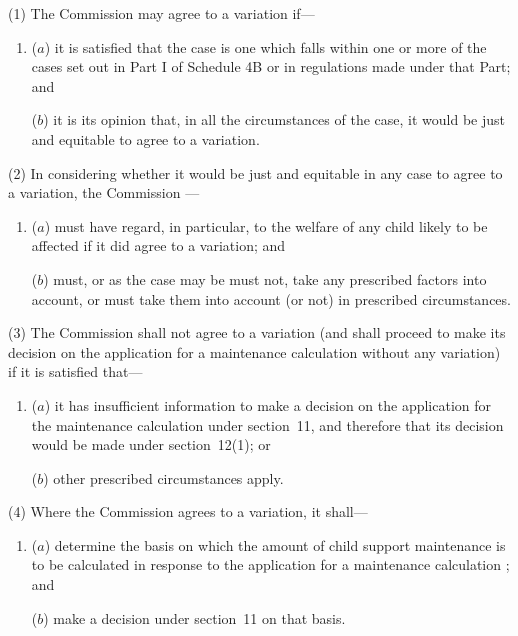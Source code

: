 \documentclass[12pt,a4paper]{article}
\begin{document}
(1) The 
Commission  %
may agree to a variation if—
\begin{enumerate}\item[]
($a$) 
it  %
is satisfied that the case is one which falls within one or more of the cases set out in Part I of Schedule 4B or in regulations made under that Part; and

($b$) it is 
its  %
opinion that, in all the circumstances of the case, it would be just and equitable to agree to a variation.
\end{enumerate}

(2) In considering whether it would be just and equitable in any case to agree to a variation, the 
Commission%
---
\begin{enumerate}\item[]
($a$) must have regard, in particular, to the welfare of any child likely to be affected if 
it  %
did agree to a variation; and

($b$) must, or as the case may be must not, take any prescribed factors into account, or must take them into account (or not) in prescribed circumstances.
\end{enumerate}

(3) The 
Commission  %
shall not agree to a variation (and shall proceed to make 
its  %
decision on the application for a maintenance calculation without any variation) if 
it  %
is satisfied that—
\begin{enumerate}\item[]
($a$) 
it  %
has insufficient information to make a decision on the application for the maintenance calculation under section~11, and therefore that 
its  %
decision would be made under section~12(1); or

($b$) other prescribed circumstances apply.
\end{enumerate}

(4) Where the 
Commission  %
agrees to a variation, 
it  %
shall—
\begin{enumerate}\item[]
($a$) determine the basis on which the amount of child support maintenance is to be calculated in response to the application for a maintenance calculation%
; and

($b$) make a decision under section~11 on that basis.
\end{enumerate}
\end{document}
